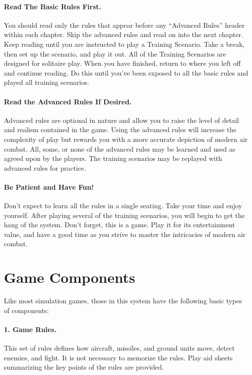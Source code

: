 \paragraph{Read The Basic Rules First.} You should read only the rules that appear before any “Advanced Rules” header within each chapter. Skip the advanced rules and read on into the next chapter. Keep reading until you are instructed to play a Training Scenario. Take a break, then set up the scenario, and play it out. All of the Training Scenarios are designed for solitaire play. When you have finished, return to where you left off and continue reading. Do this until you’ve been exposed to all the basic rules and played all training scenarios.

\paragraph{Read the Advanced Rules If Desired.} Advanced rules are optional in nature and allow you to raise the level of detail and realism contained in the game. Using the advanced rules will increase the complexity of play but rewards you with a more accurate depiction of modern air combat. All, some, or none of the advanced rules may be learned and used as agreed upon by the players. The training scenarios may be replayed with advanced rules for practice.

\paragraph{Be Patient and Have Fun!} Don’t expect to learn all the rules in a single seating. Take your time and enjoy yourself. After playing several of the training scenarios, you will begin to get the hang of the system. Don’t forget, this is a game. Play it for its entertainment value, and have a good time as you strive to master the intricacies of modern air combat.

\section{Game Components}

Like most simulation games, those in this system have the following basic types of components:

\paragraph{1. Game Rules.} This set of rules defines how aircraft, missiles, and ground units move, detect enemies, and fight. It is not necessary to memorize the rules. Play aid sheets summarizing the key points of the rules are provided.

